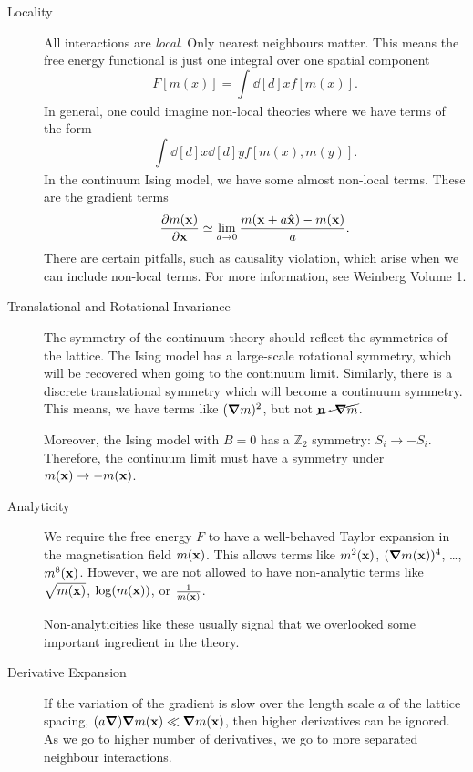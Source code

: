 \begin{description}
  \item[Locality] All interactions are \emph{local}. Only nearest neighbours matter.
    This means the free energy functional is just one integral over one spatial component
    \begin{equation}
      F[m(x)] = \int_{}^{} \dd[d]{x} f[m(x)].
    \end{equation}
    In general, one could imagine non-local theories where we have terms of the form \[\int_{}^{} \dd[d]{x} \dd[d]{y} f[m(x), m(y)]. \]
    In the continuum Ising model, we have some almost non-local terms. These are the gradient terms
    \begin{equation}
      \pdv{m(\vb{x})}{\vb{x}} \simeq \lim_{a \to 0} \frac{m(\vb{x} + a\hat{\vb{x}}) - m(\vb{x})}{a} . 
    \end{equation}
    There are certain pitfalls, such as causality violation, which arise when we can include non-local terms. For more information, see Weinberg Volume 1.
  \item[Translational and Rotational Invariance] The symmetry of the continuum theory should reflect the symmetries of the lattice. The Ising model has a large-scale rotational symmetry, which will be recovered when going to the continuum limit.
    Similarly, there is a discrete translational symmetry which will become a continuum symmetry.
    This means, we have terms like $(\grad m)^2$, but not $\cancel{\vb{n} \cdot \grad m}$.

    Moreover, the Ising model with $B = 0$ has a $\mathbb{Z}_2$ symmetry: $S_i \to -S_i$. Therefore, the continuum limit must have a symmetry under $m(\vb{x}) \to -m(\vb{x})$.
  \item[Analyticity] We require the free energy $F$ to have a well-behaved Taylor expansion in the magnetisation field $m(\vb{x})$.
    This allows terms like $m^2(\vb{x})$, $(\grad m(\vb{x}))^4$, \ldots, $m^8(\vb{x})$. However, we are not allowed to have non-analytic terms like $\sqrt{m(\vb{x})}$, $\log(m(\vb{x}))$, or $\frac{1}{m(\vb{x})}$.
    \begin{leftbar}
      \begin{remark}
        Non-analyticities like these usually signal that we overlooked some important ingredient in the theory.
      \end{remark}
    \end{leftbar}
  \item[Derivative Expansion] If the variation of the gradient is slow over the length scale $a$ of the lattice spacing, $(a \grad) \grad m(\vb{x}) \ll \grad m(\vb{x})$, then higher derivatives can be ignored.
    As we go to higher number of derivatives, we go to more separated neighbour interactions.
\end{description}

